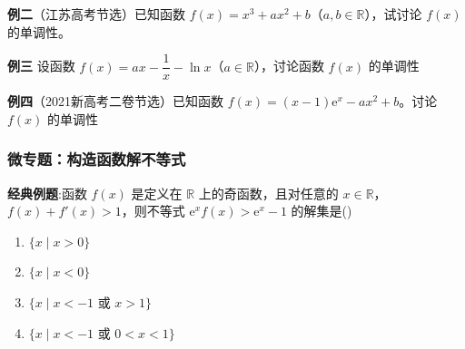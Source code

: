 \documentclass{article}
\begin{document}
\noindent \textbf{例二}（江苏高考节选）已知函数 \(f(x) = x^3 + ax^2 + b\)（\(a,b \in \mathbb{R}\)），试讨论 \(f(x)\) 的单调性。
\vspace{15\baselineskip}


\vspace{4\baselineskip}

\noindent \textbf{例三} \;\;设函数 \(f(x) = ax - \dfrac{1}{x} - \ln x\)（\(a \in \mathbb{R}\)），讨论函数 \(f(x)\) 的单调性
\vspace{30\baselineskip}

\noindent \textbf{例四}（2021新高考二卷节选）已知函数 \(f(x) = (x - 1)\mathrm{e}^x - ax^2 + b\)。讨论 \(f(x)\) 的单调性

\newpage
\begin{center}
\subsubsection*{微专题：构造函数解不等式}
\end{center}

\noindent \textbf{经典例题}:\;\;函数 \(f(x)\) 是定义在 \(\mathbb{R}\) 上的奇函数，且对任意的 \(x \in \mathbb{R}\)，\(f(x) + f'(x) > 1\)，则不等式 \(\mathrm{e}^x f(x) > \mathrm{e}^x - 1\) 的解集是(\;\;\;)

\begin{enumerate}
    \item[A.] \(\{x \mid x > 0\}\)
    \item[B.] \(\{x \mid x < 0\}\)
    \item[C.] \(\{x \mid x < -1 \text{ 或 } x > 1\}\)
    \item[D.] \(\{x \mid x < -1 \text{ 或 } 0 < x < 1\}\)
\end{enumerate}
\end{document}
